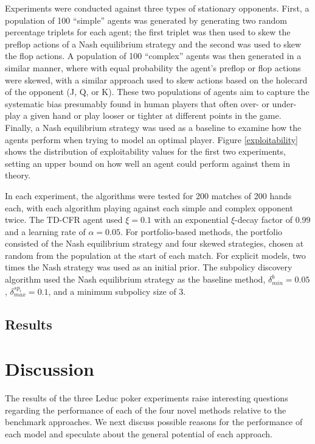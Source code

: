 \documentclass{aamas2013}
\begin{document}
    Experiments were conducted against three types of stationary opponents. First, a population of 100 ``simple'' agents was generated by generating two random percentage triplets for each agent; the first triplet was then used to skew the preflop actions of a Nash equilibrium strategy and the second was used to skew the flop actions. A population of 100 ``complex'' agents was then generated in a similar manner, where with equal probability the agent's preflop or flop actions were skewed, with a similar approach used to skew actions based on the holecard of the opponent (J, Q, or K). These two populations of agents aim to capture the systematic bias presumably found in human players that often over- or under- play a given hand or play looser or tighter at different points in the game. Finally, a Nash equilibrium strategy was used as a baseline to examine how the agents perform when trying to model an optimal player. Figure \ref{exploitability} shows the distribution of exploitability values for the first two experiments, setting an upper bound on how well an agent could perform against them in theory.

    In each experiment, the algorithms were tested for 200 matches of 200 hands each, with each algorithm playing against each simple and complex opponent twice. The TD-CFR agent used $\xi=0.1$ with an exponential $\xi$-decay factor of $0.99$ and a learning rate of $\alpha=0.05$. For portfolio-based methods, the portfolio consisted of the Nash equilibrium strategy and four skewed strategies, chosen at random from the population at the start of each match. For explicit models, two times the Nash strategy was used as an initial prior. The subpolicy discovery algorithm used the Nash equilibrium strategy as the baseline method, $\delta_{min}^{b}=0.05$, $\delta_{max}^{sp_i}=0.1$, and a minimum subpolicy size of 3.

    \subsection{Results}


\section{Discussion}
The results of the three Leduc poker experiments raise interesting questions regarding the performance of each of the four novel methods relative to the benchmark approaches. We next discuss possible reasons for the performance of each model and speculate about the general potential of each approach.
\end{document}
